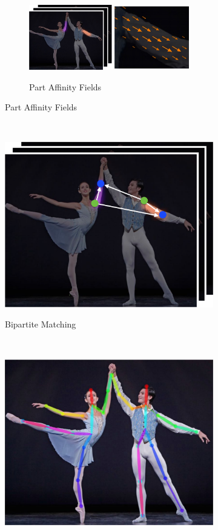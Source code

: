 \begin{figure}[t!]
\begin{subfigure}[t]{0.24\textwidth}
    \begin{subfigure}[b]{1\textwidth}
      \includegraphics[width=0.9\linewidth]{img/openpose_pipeline_c}
      \label{fig:oppC}
      \caption{Part Affinity Fields}
    \end{subfigure}    
  \end{subfigure}%
  ~
  \begin{subfigure}[t]{0.24\textwidth}
    \includegraphics[width=0.9\linewidth]{img/openpose_pipeline_d}
    \label{fig:oppD}
    \caption{Bipartite Matching}
  \end{subfigure}%
  ~
  \begin{subfigure}[t]{0.24\textwidth}
    \includegraphics[width=0.9\linewidth]{img/openpose_pipeline_e}

\end{subfigure}
\end{figure}
